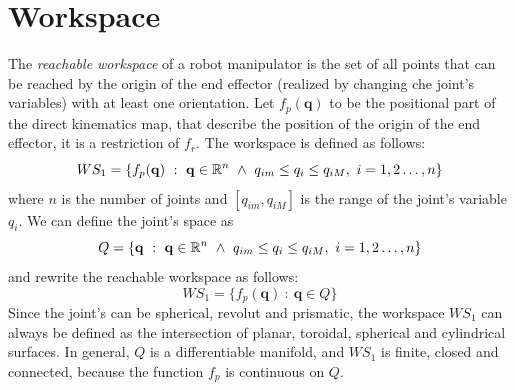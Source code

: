 \documentclass[10pt, letterpaper]{report}
\begin{document}
\section{Workspace}
The \textit{reachable workspace} of a robot manipulator is the set of all points that can be reached by the origin of the end effector (realized by changing che joint's variables) with at least one orientation. Let $f_{p}(\mathbf q)$ to be the positional part of the direct kinematics map, that describe the position of the origin of the end effector, it is a restriction of $f_r$. The workspace is defined as follows:\begin{equation}
    WS_1=\{ f_p(\mathbf q) \  : \ \mathbf q \in {\mathbb R}^n \ \land \ q_{im}\le q_i\le q_{iM}, \ i=1,2\dots, n \}
\end{equation}
where $n$ is the number of joints and $[q_{im},q_{iM}]$ is the range of the joint's variable $q_i$. We can define the joint's space as
\begin{equation}
    Q=\{ \mathbf q \  : \ \mathbf q \in \R^n \ \land \ q_{im}\le q_i\le q_{iM}, \ i=1,2\dots, n \}
\end{equation}
and rewrite the reachable workspace as follows:\begin{equation}
     WS_1=\{ f_p(\mathbf q) \  : \ \mathbf q \in Q\}
\end{equation}
Since the joint's can be spherical, revolut and prismatic, the workspace $WS_1$ can always be defined as the intersection of planar, toroidal, spherical and cylindrical surfaces. In general, $Q$ is a differentiable manifold, and $WS_1$ is finite, closed and connected, because the function $f_p$ is continuous on $Q$.\bigskip 
\end{document}

